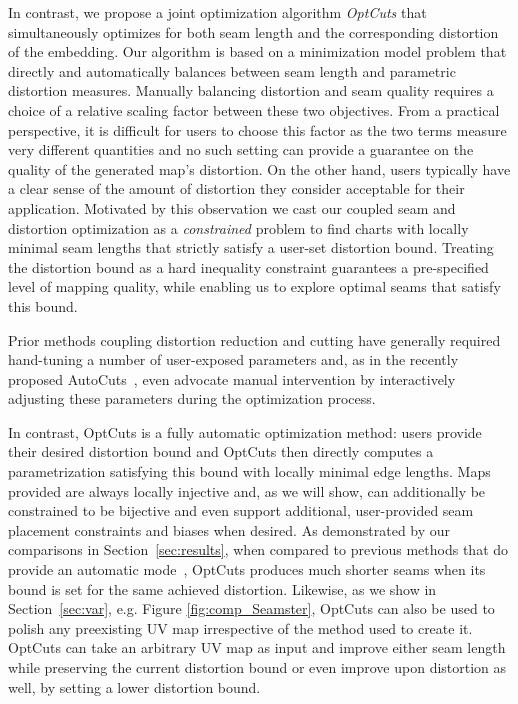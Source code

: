 In contrast, we propose a joint optimization algorithm {\em OptCuts} that simultaneously optimizes for both seam length and the corresponding distortion of the embedding.
Our algorithm is based on a minimization model problem that directly and automatically balances between seam length and parametric distortion measures. Manually balancing distortion and seam quality requires a choice of a relative scaling factor between these two objectives. From a practical perspective, it is difficult for users to choose this factor as the two terms measure very different quantities and no such setting can provide a guarantee on the quality of the generated map's distortion. 
On the other hand, users typically have a clear sense of the amount of distortion they consider acceptable for their application. Motivated by this observation we cast our coupled seam and distortion optimization as a \emph{constrained} problem to find charts with locally minimal seam lengths that strictly satisfy a user-set distortion bound. Treating the distortion bound as a hard inequality constraint guarantees a pre-specified level of mapping quality, while enabling us to explore optimal seams that satisfy this bound. %

Prior methods coupling distortion reduction and cutting have generally required hand-tuning a number of user-exposed parameters and, as in the recently proposed AutoCuts~\cite{Poranne2017Autocuts}, even advocate manual intervention by interactively adjusting these parameters during the optimization process.

In contrast, OptCuts is a fully automatic optimization method: users provide their desired distortion bound and OptCuts then directly computes a parametrization satisfying this bound with locally minimal edge lengths. Maps provided are always locally injective and, as we will show, can additionally be constrained to be bijective and even support additional, user-provided seam placement constraints and biases when desired. 
As demonstrated by our comparisons in Section~\ref{sec:results},
when compared to previous methods that do provide an automatic mode~\cite{BoundedDistortParam:2002,Poranne2017Autocuts}, OptCuts produces much shorter seams when its bound is set for the same achieved distortion. 
Likewise, as we show in Section~\ref{sec:var}, e.g. Figure \ref{fig:comp_Seamster}, OptCuts can also be used to polish any preexisting UV map irrespective of the method used to create it. OptCuts can take an arbitrary UV map as input and improve either seam length while preserving the current distortion bound or even improve upon distortion as well, by setting a lower distortion bound.

